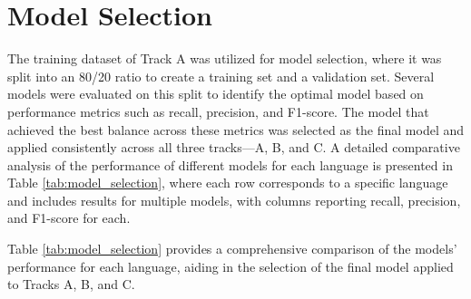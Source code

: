 \section{Model Selection}
\label{sec:appendix_model_selection}
The training dataset of Track A was utilized for model selection, where it was split into an 80/20 ratio to create a training set and a validation set. Several models were evaluated on this split to identify the optimal model based on performance metrics such as recall, precision, and F1-score. The model that achieved the best balance across these metrics was selected as the final model and applied consistently across all three tracks—A, B, and C. A detailed comparative analysis of the performance of different models for each language is presented in Table \ref{tab:model_selection}, where each row corresponds to a specific language and includes results for multiple models, with columns reporting recall, precision, and F1-score for each.

Table \ref{tab:model_selection} provides a comprehensive comparison of the models' performance for each language, aiding in the selection of the final model applied to Tracks A, B, and C.




